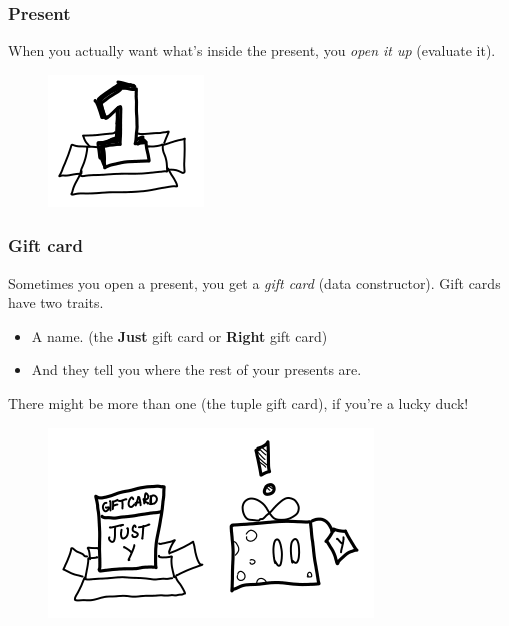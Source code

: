 \documentclass{beamer}
\begin{document}

\begin{frame}
\frametitle{Present}
When you actually want what’s inside the present, you \textit{open it up} (evaluate it).\newline
\begin{figure}[hbt!]
    \centering
    \includegraphics[height=0.4\textheight]{./pic/thunk-nullary.png}
\end{figure}
\end{frame}


\begin{frame}
\frametitle{Gift card}
Sometimes you open a present, you get a \textit{gift card} (data constructor).\newline
Gift cards have two traits.\newline
\begin{itemize}
    \item A name. (the \textbf{Just} gift card or \textbf{Right} gift card)\newline
    \item And they tell you where the rest of your presents are.\newline
\end{itemize}
There might be more than one (the tuple gift card), if you’re a lucky duck!
\begin{figure}[hbt!]
    \centering
    \includegraphics[height=0.4\textheight]{./pic/thunk-constructor.png}
\end{figure}
\end{frame}
\end{document}
